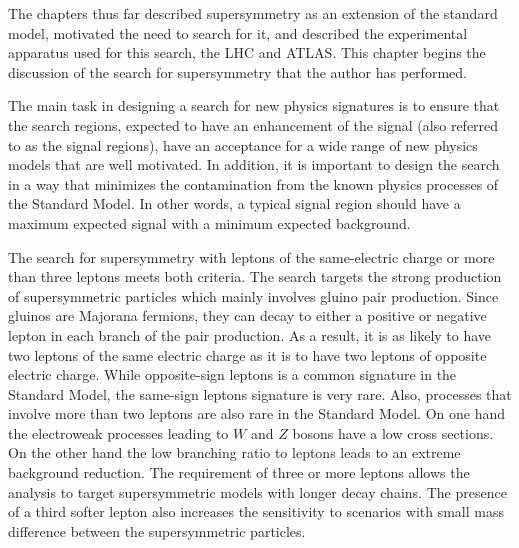 The chapters thus far described supersymmetry as an extension of the standard 
model, motivated the need to search for it, and described the experimental 
apparatus used for this search, the LHC and ATLAS. 
This chapter begins the discussion of the search for supersymmetry that the 
author has performed.

The main task in designing a search for new physics signatures is to ensure 
that the search regions, expected to have an enhancement of the signal
 (also referred to as the signal regions), 
 have an acceptance for a wide 
range of new physics models that are well motivated.
In addition, it is important to design the search in a way that minimizes the
contamination from the known physics processes of the Standard Model.
In other words, a typical signal region should have a maximum expected 
signal with a minimum expected background. 

The search for supersymmetry with leptons of the same-electric charge
or more than three leptons meets both criteria. 
The search targets the strong production of supersymmetric particles 
which mainly involves gluino pair production. Since gluinos are Majorana 
fermions, they can decay to either a positive or negative lepton in each branch
of the pair production. As a result, it is as likely to have two leptons 
of the same electric charge as it is to have two leptons of opposite electric
charge. While opposite-sign leptons is a common signature in the 
Standard Model, the same-sign leptons signature is very rare. 
Also, processes that involve more than two leptons are also rare in the 
Standard Model. On one hand the electroweak processes leading to 
$W$ and $Z$ bosons have a low cross sections. On the other hand the low 
branching ratio to leptons leads to an extreme background reduction.
The requirement of three or more leptons allows the analysis 
to target supersymmetric models with longer decay chains. The presence of 
a third softer lepton also increases the sensitivity to scenarios with 
small mass difference between the supersymmetric particles.

